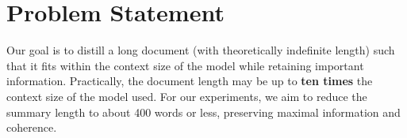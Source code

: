 \section{Problem Statement}
	\label{sec:problem}

	Our goal is to distill a long document (with theoretically indefinite length) such that it fits
	within the context size of the model while retaining important information.
	Practically, the document length may be up to \textbf{ten times} the context size of the model
	used.
	For our experiments, we aim to reduce the summary length to about 400 words or less, preserving
	maximal information and coherence.
